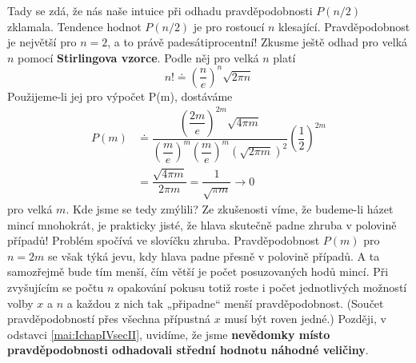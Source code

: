       Tady se zdá, že nás naše intuice při odhadu pravděpodobnosti \(P(n/2)\) zklamala. Tendence
      hodnot \(P(n/2)\) je pro rostoucí \(n\) klesající. Pravděpodobnost je největší pro \(n = 2\),
      a to právě padesátiprocentní! Zkusme ještě odhad pro velká \(n\) pomocí \textbf{Stirlingova
      vzorce}. Podle něj pro velká \(n\) platí    
      \begin{equation}\label{mai:eq056}
        \boxed{n! \doteq \left(\dfrac{n}{e}\right)^n\sqrt{2\pi n}}
      \end{equation}
      Použijeme-li jej pro výpočet P(m), dostáváme
      \begin{align*}
        P(m)&\doteq \dfrac{\left(\dfrac{2m}{e}\right)^{2m}\sqrt{4\pi m}}
             {\left(\dfrac{m}{e}\right)^m\left(\dfrac{m}{e}\right)^m\left(\sqrt{2\pi m}\right)^2}
              \left(\dfrac{1}{2}\right)^{2m}                                       \\
            &= \dfrac{\sqrt{4\pi m}}{2\pi m}
         =\dfrac{1}{\sqrt{\pi m}} \longrightarrow 0
      \end{align*}
      pro velká \(m\). Kde jsme se tedy zmýlili? Ze zkušenosti víme, že budeme-li házet mincí
      mnohokrát, je prakticky jisté, že hlava skutečně padne zhruba v polovině případů! Problém
      spočívá ve slovíčku zhruba. Pravděpodobnost \(P(m)\) pro \(n = 2m\) se však týká jevu, kdy
      hlava padne přesně v polovině případů. A ta samozřejmě bude tím menší, čím větší je počet
      posuzovaných hodů mincí. Při zvyšujícím se počtu \(n\) opakování pokusu totiž roste i počet
      jednotlivých možností volby \(x\) a \(n\) a každou z nich tak „připadne“ menší
      pravděpodobnost. (Součet pravděpodobností přes všechna přípustná \(x\) musí být roven jedné.)
      Později, v odstavci \ref{mai:IchapIVsecII}, uvidíme, že jsme \textbf{nevědomky místo
      pravděpodobnosti odhadovali střední hodnotu náhodné veličiny}.
      
